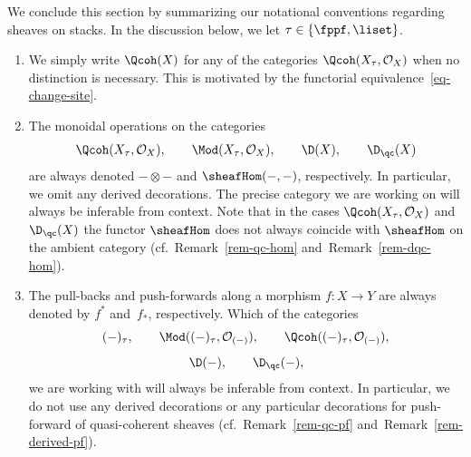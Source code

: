 \begin{notation}
\label{not-sheaf-op}
We conclude this section by summarizing our notational conventions regarding sheaves on stacks.
In the discussion below, we let $\tau \in \{\fppf, \liset\}$.
\begin{enumerate}
\item
We simply write $\Qcoh(X)$ for any of the categories $\Qcoh(X_\tau, \mathcal{O}_X)$
when no distinction is necessary.
This is motivated by the functorial equivalence~\eqref{eq-change-site}.
\item
The monoidal operations on the categories
$$
\Qcoh(X_\tau, \mathcal{O}_X), \qquad
\Mod(X_\tau, \mathcal{O}_X), \qquad
\D(X), \qquad
\D_\qc(X)
$$
are always denoted $-\otimes-$ and $\sheafHom(-,-)$, respectively.
In particular, we omit any derived decorations.
The precise category we are working on will always be inferable from context.
Note that in the cases $\Qcoh(X_\tau, \mathcal{O}_X)$ and~$\D_\qc(X)$
the functor $\sheafHom$ does not always coincide with $\sheafHom$ on
the ambient category (cf.~Remark~\ref{rem-qc-hom} and~Remark~\ref{rem-dqc-hom}). 
\item
The pull-backs and push-forwards along a morphism $f\colon X \to Y$ are always denoted by $f^*$ and~$f_*$,
respectively.
Which of the categories
$$
(-)_\tau,\qquad
\Mod((-)_\tau, \mathcal{O}_{(-)}), \qquad
\Qcoh((-)_\tau, \mathcal{O}_{(-)}),
$$
$$
\D(-), \qquad
\D_\qc(-),
$$
we are working with will always be inferable from context.
In particular, 
we do not use any derived decorations or any particular decorations for
push-forward of quasi-coherent sheaves (cf.~Remark~\ref{rem-qc-pf} and~Remark~\ref{rem-derived-pf}).
\end{enumerate}
\end{notation}

